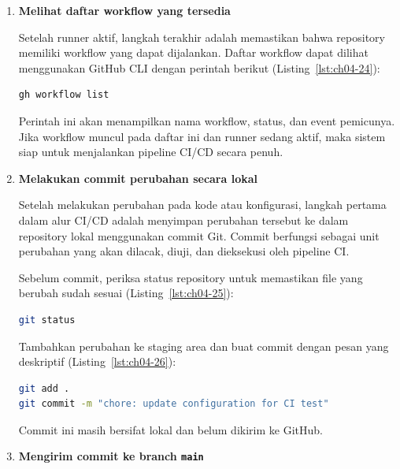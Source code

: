 \begin{enumerate}
Untuk penggunaan jangka panjang di server, runner sebaiknya dijalankan
sebagai service sistem, namun untuk tujuan praktikum, mode manual ini
sudah mencukupi.

\item \textbf{Melihat daftar workflow yang tersedia}

Setelah runner aktif, langkah terakhir adalah memastikan bahwa repository
memiliki workflow yang dapat dijalankan. Daftar workflow dapat dilihat
menggunakan GitHub CLI dengan perintah berikut (Listing~\ref{lst:ch04-24}):

\begin{lstlisting}[language=bash, caption={Memantau workflow di GitHub}, label={lst:ch04-24}]
gh workflow list
\end{lstlisting}

Perintah ini akan menampilkan nama workflow, status, dan event pemicunya.
Jika workflow muncul pada daftar ini dan runner sedang aktif, maka sistem
siap untuk menjalankan pipeline CI/CD secara penuh.


  \item \textbf{Melakukan commit perubahan secara lokal}

Setelah melakukan perubahan pada kode atau konfigurasi, langkah pertama
dalam alur CI/CD adalah menyimpan perubahan tersebut ke dalam repository
lokal menggunakan commit Git. Commit berfungsi sebagai unit perubahan yang
akan dilacak, diuji, dan dieksekusi oleh pipeline CI.

Sebelum commit, periksa status repository untuk memastikan file yang
berubah sudah sesuai (Listing~\ref{lst:ch04-25}):

\begin{lstlisting}[language=bash, caption={Mengirim perubahan ke repositori}, label={lst:ch04-25}]
git status
\end{lstlisting}

Tambahkan perubahan ke staging area dan buat commit dengan pesan yang
deskriptif (Listing~\ref{lst:ch04-26}):

\begin{lstlisting}[language=bash, caption={Mengirim perubahan ke repositori (2)}, label={lst:ch04-26}]
git add .
git commit -m "chore: update configuration for CI test"
\end{lstlisting}

Commit ini masih bersifat lokal dan belum dikirim ke GitHub.

\item \textbf{Mengirim commit ke branch \texttt{main}}


\end{enumerate}
